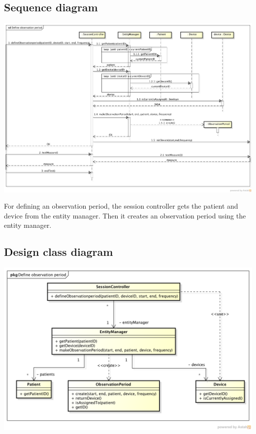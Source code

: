 \documentclass[fontsize=12pt,
               paper=a4,
               twoside=false,
               parskip=half,
               ]{scrartcl}
\begin{document}
\subsection{Sequence diagram}

\includegraphics[width=15cm]{./img/sequence-diagrams/define-observation-period.png}

For defining an observation period, the session controller gets the patient and device from the entity manager. Then it creates an observation period using the entity manager.

\subsection{Design class diagram}

\includegraphics[width=15cm]{./img/design-class-diagrams/define-observation-period.png}
\end{document}
